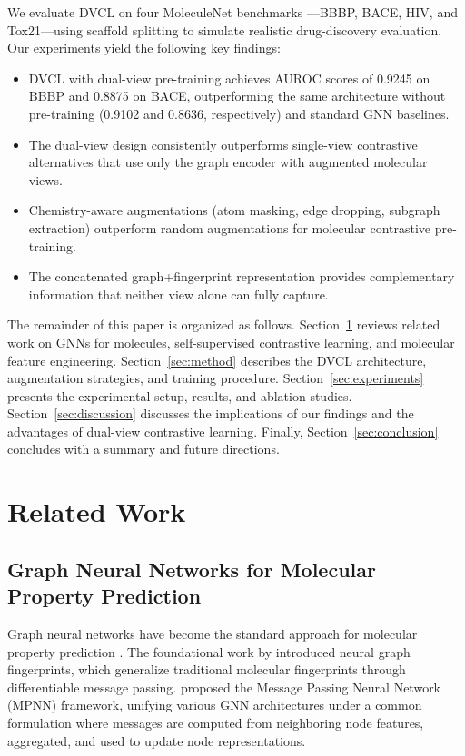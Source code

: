 \documentclass[a4paper,fleqn]{cas-sc}
\begin{document}
We evaluate DVCL on four MoleculeNet benchmarks \citep{wu2018moleculenet}---BBBP, BACE, HIV, and Tox21---using scaffold splitting to simulate realistic drug-discovery evaluation. Our experiments yield the following key findings:

\begin{itemize}
\item DVCL with dual-view pre-training achieves AUROC scores of 0.9245 on BBBP and 0.8875 on BACE, outperforming the same architecture without pre-training (0.9102 and 0.8636, respectively) and standard GNN baselines.
\item The dual-view design consistently outperforms single-view contrastive alternatives that use only the graph encoder with augmented molecular views.
\item Chemistry-aware augmentations (atom masking, edge dropping, subgraph extraction) outperform random augmentations for molecular contrastive pre-training.
\item The concatenated graph+fingerprint representation provides complementary information that neither view alone can fully capture.
\end{itemize}

The remainder of this paper is organized as follows. Section~\ref{sec:related} reviews related work on GNNs for molecules, self-supervised contrastive learning, and molecular feature engineering. Section~\ref{sec:method} describes the DVCL architecture, augmentation strategies, and training procedure. Section~\ref{sec:experiments} presents the experimental setup, results, and ablation studies. Section~\ref{sec:discussion} discusses the implications of our findings and the advantages of dual-view contrastive learning. Finally, Section~\ref{sec:conclusion} concludes with a summary and future directions.


\section{Related Work}\label{sec:related}

\subsection{Graph Neural Networks for Molecular Property Prediction}

Graph neural networks have become the standard approach for molecular property prediction \citep{wu2021comprehensive}. The foundational work by \citet{duvenaud2015convolutional} introduced neural graph fingerprints, which generalize traditional molecular fingerprints through differentiable message passing. \citet{gilmer2017neural} proposed the Message Passing Neural Network (MPNN) framework, unifying various GNN architectures under a common formulation where messages are computed from neighboring node features, aggregated, and used to update node representations.
\end{document}
